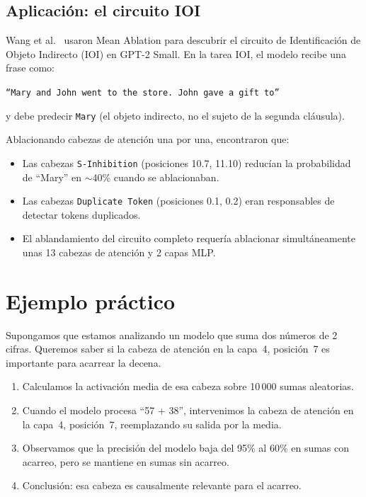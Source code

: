 \documentclass[11pt,a4paper]{report}
\theoremstyle{definition}
\begin{document}
\subsection{Aplicación: el circuito IOI}

Wang et al.~\cite{wang2022ioi} usaron Mean Ablation para descubrir el circuito de Identificación de Objeto Indirecto (IOI) en GPT-2 Small. En la tarea IOI, el modelo recibe una frase como:

\begin{center}
\texttt{``Mary and John went to the store. John gave a gift to''}
\end{center}

y debe predecir \texttt{Mary} (el objeto indirecto, no el sujeto de la segunda cláusula).

Ablacionando cabezas de atención una por una, encontraron que:

\begin{itemize}
    \item Las cabezas \texttt{S-Inhibition} (posiciones 10.7, 11.10) reducían la probabilidad de ``Mary'' en $\sim$40\% cuando se ablacionaban.
    \item Las cabezas \texttt{Duplicate Token} (posiciones 0.1, 0.2) eran responsables de detectar tokens duplicados.
    \item El ablandamiento del circuito completo requería ablacionar simultáneamente unas 13 cabezas de atención y 2 capas MLP.
\end{itemize}

\section{Ejemplo práctico}

Supongamos que estamos analizando un modelo que suma dos números de 2 cifras. Queremos saber si la cabeza de atención en la capa~4, posición~7 es importante para acarrear la decena.

\begin{enumerate}
    \item Calculamos la activación media de esa cabeza sobre 10\,000 sumas aleatorias.
    \item Cuando el modelo procesa ``57 + 38'', intervenimos la cabeza de atención en la capa~4, posición~7, reemplazando su salida por la media.
    \item Observamos que la precisión del modelo baja del 95\% al 60\% en sumas con acarreo, pero se mantiene en sumas sin acarreo.
    \item Conclusión: esa cabeza es causalmente relevante para el acarreo.
\end{enumerate}
\end{document}
